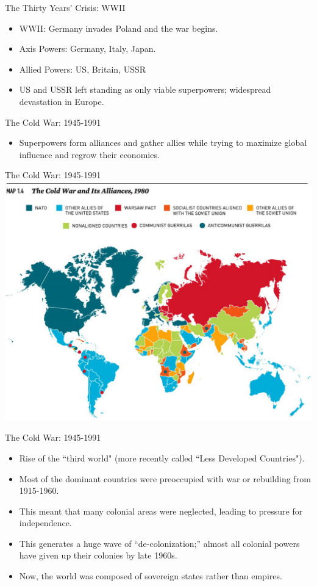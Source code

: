 \documentclass{beamer}
\begin{document}
\begin{frame}{\LARGE The Thirty Years' Crisis: WWII}
	\begin{itemize}
		\item WWII: Germany invades Poland and the war begins.
		\item Axis Powers: Germany, Italy, Japan.
		\item Allied Powers: US, Britain, USSR
		\item US and USSR left standing as only viable superpowers; widespread devastation in Europe.
	\end{itemize}
\end{frame}

\begin{frame}{\LARGE The Cold War: 1945-1991}
	\begin{itemize}
		\item Superpowers form alliances and gather allies while trying to maximize global influence and regrow their economies.
	\end{itemize}
\end{frame}

\begin{frame}{\LARGE The Cold War: 1945-1991}
	\centering
	\includegraphics[width=\textwidth,height=.9\textheight,keepaspectratio]{ColdWar1980.jpg}
\end{frame}

\begin{frame}{\LARGE The Cold War: 1945-1991}
	\begin{itemize}
		\item Rise of the ``third world" (more recently called ``Less Developed Countries").
		\item Most of the dominant countries were preoccupied with war or rebuilding from 1915-1960.
		\item This meant that many colonial areas were neglected, leading to pressure for independence.
		\item This generates a huge wave of “de-colonization;” almost all colonial powers have given up their colonies by late 1960s.
		\item Now, the world was composed of sovereign states rather than empires.
	\end{itemize}
\end{frame}
\end{document}

